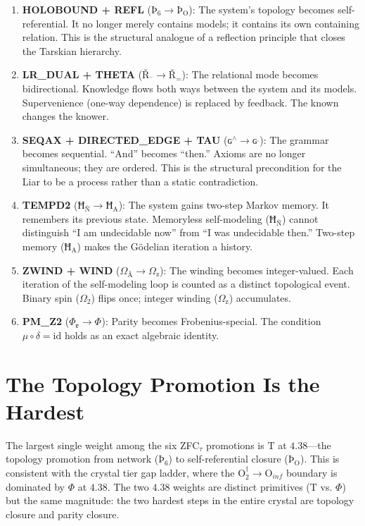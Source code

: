 \documentclass[12pt,twoside]{book}
\theoremstyle{definition}
\newcommand{\moebius}{\mu \circ \delta = \text{id}}
\newcommand{\prim}[1]{\text{#1}}
\newcommand{\tier}[1]{\text{O}_{#1}}
\begin{document}
\begin{enumerate}
\item \textbf{HOLOBOUND + REFL} ($\text{Þ}_{\text{6}} \to \text{Þ}_{\text{O}}$): The system's topology becomes self-referential. It no longer merely contains models; it contains its own containing relation. This is the structural analogue of a reflection principle that closes the Tarskian hierarchy.

\item \textbf{LR\_DUAL + THETA} ($\text{Ř}_{\text{¯}} \to \text{Ř}_{\text{=}}$): The relational mode becomes bidirectional. Knowledge flows both ways between the system and its models. Supervenience (one-way dependence) is replaced by feedback. The known changes the knower.

\item \textbf{SEQAX + DIRECTED\_EDGE + TAU} ($\text{ɢ}^{\land} \to \text{ɢ}^{\text{ˌ}}$): The grammar becomes sequential. ``And'' becomes ``then.'' Axioms are no longer simultaneous; they are ordered. This is the structural precondition for the Liar to be a process rather than a static contradiction.

\item \textbf{TEMPD2} ($\text{Ħ}_{\text{Ñ}} \to \text{Ħ}_{\text{A}}$): The system gains two-step Markov memory. It remembers its previous state. Memoryless self-modeling ($\text{Ħ}_{\text{Ñ}}$) cannot distinguish ``I am undecidable now'' from ``I was undecidable then.'' Two-step memory ($\text{Ħ}_{\text{A}}$) makes the G\"odelian iteration a history.

\item \textbf{ZWIND + WIND} ($\Omega_{\text{Å}} \to \Omega_{\text{z}}$): The winding becomes integer-valued. Each iteration of the self-modeling loop is counted as a distinct topological event. Binary spin ($\Omega_{\text{2}}$) flips once; integer winding ($\Omega_{\text{z}}$) accumulates.

\item \textbf{PM\_Z2} ($\Phi_{\text{ɐ}} \to \Phi_{\text{}}$): Parity becomes Frobenius-special. The condition $\moebius$ holds as an exact algebraic identity.
\end{enumerate}

\section{The Topology Promotion Is the Hardest}

The largest single weight among the six ZFC$_{\tau}$ promotions is $\prim{T}$ at $4.38$---the topology promotion from network ($\text{Þ}_{\text{6}}$) to self-referential closure ($\text{Þ}_{\text{O}}$). This is consistent with the crystal tier gap ladder, where the $\tier{2}^{\dagger} \to \tier{inf}$ boundary is dominated by $\Phi$ at $4.38$. The two $4.38$ weights are distinct primitives ($\prim{T}$ vs. $\Phi$) but the same magnitude: the two hardest steps in the entire crystal are topology closure and parity closure.
\end{document}
